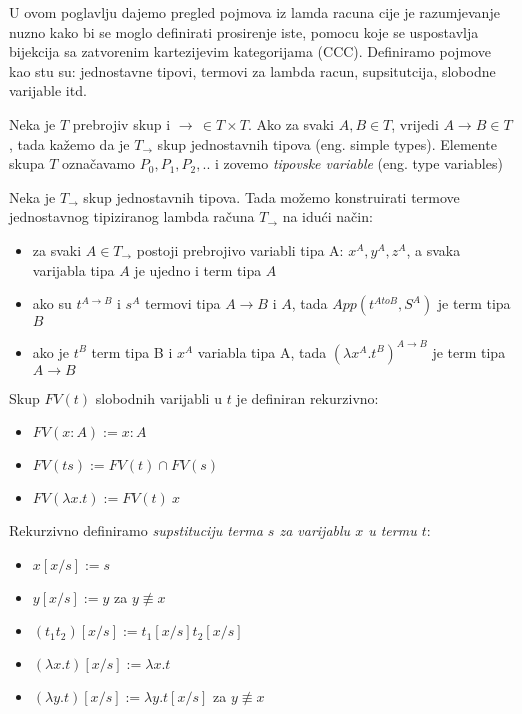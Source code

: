 U ovom poglavlju dajemo pregled pojmova iz lamda racuna cije je razumjevanje nuzno kako bi se moglo definirati prosirenje iste, pomocu koje se uspostavlja bijekcija sa zatvorenim kartezijevim kategorijama (CCC). Definiramo pojmove kao stu su: jednostavne tipovi, termovi za lambda racun, supsitutcija, slobodne varijable itd.

\begin{definition}
  Neka je $T$ prebrojiv skup i $\to \, \in T \times T$.
    Ako za svaki $A, B \in T$, vrijedi $A \to B \in T$, tada kažemo da je $T_{\to}$ skup jednostavnih tipova (eng. simple types). Elemente skupa $T$ označavamo $P_0, P_1, P_2, ..$ i zovemo \emph{tipovske variable} (eng. type variables)
\end{definition}



\begin{definition}
  Neka je $T_\to$ skup jednostavnih tipova. Tada možemo konstruirati termove jednostavnog tipiziranog lambda računa $T_\to$ na idući način:
  \begin{itemize}
    \item za svaki $A \in T_\to$ postoji prebrojivo variabli tipa A: $x^A, y^A, z^A$, a svaka varijabla tipa $A$ je ujedno i term tipa $A$
    \item ako su $t^{A \to B}$ i $s^A$ termovi tipa $A \to B$ i $A$, tada $App(t^{A to B}, S^A)$ je term tipa $B$
    \item ako je $t^B$ term tipa B i $x^A$ variabla tipa A, tada $(\lambda x^A . t^B)^{A \to B}$ je term tipa ${A \to B}$
  \end{itemize}
\end{definition}

\begin{definition}
  Skup $FV(t)$ slobodnih varijabli u $t$ je definiran rekurzivno:
  \begin{itemize}
    \item $FV(x : A) := x : A$
    \item $FV(ts) := FV(t) \cap FV(s)$
    \item $FV(\lambda x . t) := FV(t) \ {x}$
  \end{itemize}
\end{definition}

\begin{definition}[Substitucija]
  Rekurzivno definiramo \emph{supstituciju terma $s$ za varijablu $x$ u termu $t$}:
  \begin{itemize}
    \item $x[x/s] := s$
    \item $y[x/s] := y$ za $y \not\equiv x$
    \item $(t_1t_2)[x/s] := t_1[x/s]t_2[x/s]$
    \item $(\lambda x . t)[x / s] := \lambda x . t$
    \item $(\lambda y . t)[x / s] := \lambda y . t[x/s]$ za $y \not\equiv x$
  \end{itemize}
\end{definition}

